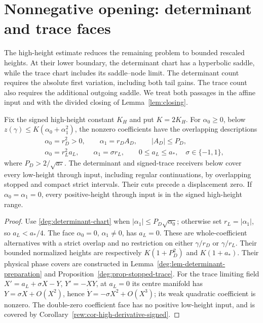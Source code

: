 \section{Nonnegative opening: determinant and trace faces}
\label{sec:nonnegative-opening}
\label{subsec:deg-nonnegative}

The high-height estimate reduces the remaining problem to bounded
rescaled heights. At their lower boundary, the determinant chart has a
hyperbolic saddle, while the trace chart includes its saddle--node limit.
The determinant count requires the absolute first variation, including
both tail gains. The trace count also requires the additional outgoing
saddle. We treat
both passages in the affine input and with the divided closing of
Lemma~\ref{lem:closing}.

\begin{lemma}
\label{deg:lem-positive-atlas}
Fix the signed high-height constant \(K_H\) and put \(K=2K_H\).
For \(\alpha_0\ge0\), below \(z(\gamma)\le K(\alpha_0+\alpha_1^2)\),
the nonzero coefficients have the overlapping descriptions
\begin{align}
 &\alpha_0=r_D^2>0,\qquad \alpha_1=r_DA_D,\qquad |A_D|\le P_D,
 \label{deg:determinant-chart}\\
 &\alpha_0=r_L^2a_L,\qquad \alpha_1=\sigma r_L,\qquad
 0\le a_L\le a_*,\quad \sigma\in\{-1,1\},
 \label{deg:trace-chart}
\end{align}
where \(P_D>2/\sqrt{a_*}\). The determinant and signed-trace
receivers below cover every low-height through input, including regular
continuations, by overlapping stopped and compact strict intervals.
Their cuts precede a displacement zero. If \(\alpha_0=\alpha_1=0\),
every positive-height through input is in the signed high-height range.
\end{lemma}

\begin{proof}
Use \eqref{deg:determinant-chart} when
\(|\alpha_1|\le P_D\sqrt{\alpha_0}\); otherwise set
\(r_L=|\alpha_1|\), so \(a_L<a_*/4\). The face
\(\alpha_0=0\), \(\alpha_1\ne0\), has \(a_L=0\).
These are whole-coefficient alternatives with a strict overlap and no
restriction on either \(\gamma/r_D\) or \(\gamma/r_L\).
Their bounded normalized heights are respectively \(K(1+P_D^2)\)
and \(K(1+a_*)\). Their physical phase covers are constructed in
Lemma~\ref{deg:lem-determinant-preparation} and
Proposition~\ref{deg:prop-stopped-trace}. For the trace limiting field
\(X'=a_L+\sigma X-Y\), \(Y'=-XY\), at \(a_L=0\) its centre
manifold has \(Y=\sigma X+O(X^2)\), hence
\(\dot Y=-\sigma X^2+O(X^3)\); its weak quadratic coefficient is
nonzero. The double-zero coefficient face has no positive low-height
input, and is covered by Corollary~\ref{rew:cor-high-derivative-signed}.
\end{proof}

